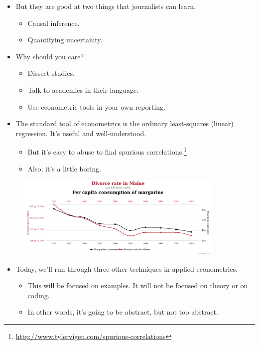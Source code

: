 \documentclass{beamer}
\begin{document}
\begin{frame}
	\begin{itemize}
		\item But they are good at two things that journalists can learn.
		\begin{itemize}
			\item Causal inference.
			\item Quantifying uncertainty.
		\end{itemize}
		\item Why should you care?
		\begin{itemize}
			\item Dissect studies.
			\item Talk to academics in their language.
			\item Use econometric tools in your own reporting.
		\end{itemize}
	\end{itemize}
\end{frame}

\begin{frame}
	\begin{itemize}
		\item The standard tool of econometrics is the ordinary least-squares (linear) regression. It's useful and well-understood.
		\begin{itemize}
			\item But it's easy to abuse to find spurious correlations.\footnote{\url{http://www.tylervigen.com/spurious-correlations}}
			\item Also, it's a little boring. 
		\end{itemize}
	\end{itemize}
	\begin{figure}
		\includegraphics[width=10cm]{spurious-correlations.png}
		\centering
	\end{figure}
\end{frame}

\begin{frame}
	\begin{itemize}
	\item Today, we'll run through three other techniques in applied econometrics.
		\begin{itemize}
			\item This will be focused on examples. It will not be focused on theory or on coding.
			\item In other words, it's going to be abstract, but not too abstract.
		\end{itemize}
	\end{itemize}
\end{frame}
\end{document}
